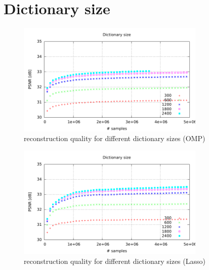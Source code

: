 \newpage
\section{Dictionary size}

\begin{figure}[h]
\centering
\includegraphics[width = 0.8\textwidth]{../tests/results/dictSizeOMP.pdf}
\caption{reconstruction quality for different dictionary sizes (OMP)}
\label{fig:dict size}
\end{figure}

\begin{figure}[h]
\centering
\includegraphics[width = 0.8\textwidth]{../tests/results/dictSizeLasso.pdf}
\caption{reconstruction quality for different dictionary sizes (Lasso)}
\label{fig:dict size}
\end{figure}


